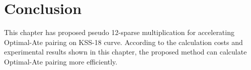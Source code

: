 \section{Conclusion}
This chapter has proposed pseudo 12-sparse multiplication for accelerating Optimal-Ate pairing on KSS-18 curve. 
According to the calculation costs and experimental results shown in this chapter, the proposed method can calculate Optimal-Ate pairing more efficiently. 

